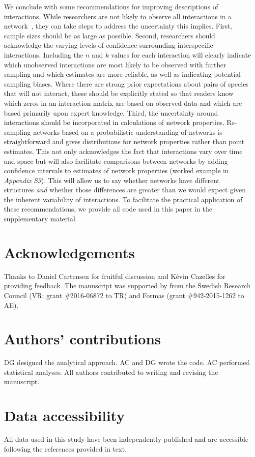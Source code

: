 \documentclass[12pt]{article}
\begin{document}
\begin{spacing}{2.0}
  We conclude with some recommendations for improving descriptions of interactions. While researchers are not likely to observe all interactions in a network~\citep{Jordano2016}, they can take steps to address the uncertainty this implies. First, sample sizes should be as large as possible. Second, researchers should acknowledge the varying levels of confidence surrounding interspecific interactions. Including the $n$ and $k$ values for each interaction will clearly indicate which unobserved interactions are most likely to be observed with further sampling and which estimates are more reliable, as well as indicating potential sampling biases. Where there are strong prior expectations about pairs of species that will not interact, these should be explicitly stated so that readers know which zeros in an interaction matrix are based on observed data and which are based primarily upon expert knowledge. Third, the uncertainty around interactions should be incorporated in calculations of network properties. Re-sampling networks based on a probabilistic understanding of networks is straightforward and gives distributions for network properties rather than point estimates. This not only acknowledges the fact that interactions vary over time and space but will also facilitate comparisons between networks by adding confidence intervals to estimates of network properties (worked example in \emph{Appendix S9}). This will allow us to say whether networks have different structures \emph{and} whether those differences are greater than we would expect given the inherent variability of interactions. To facilitate the practical application of these recommendations, we provide all code used in this paper in the supplementary material. 


\section*{Acknowledgements}

  Thanks to Daniel Cartensen for fruitful discussion and K\'{e}vin Cazelles for providing feedback. The manuscript was supported by from the Swedish Research Council (VR; grant \#2016-06872 to TR) and Formas (grant \#942-2015-1262 to AE).


\section*{Authors' contributions}

DG designed the analytical approach. AC and DG wrote the code. AC performed statistical analyses. All authors contributed to writing and revising the manuscript.


\section*{Data accessibility}

All data used in this study have been independently published and are accessible following the references provided in text.



\end{spacing}
\clearpage
\end{document}
